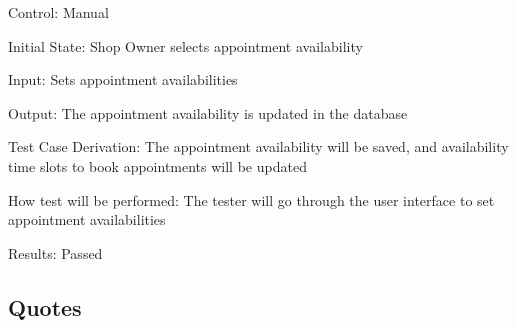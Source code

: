 \documentclass[12pt, titlepage]{article}
\begin{document}
\begin{enumerate}
	      Control: Manual

	      Initial State: Shop Owner selects appointment availability

	      Input: Sets appointment availabilities

	      Output: The appointment availability is updated in the database

	      Test Case Derivation: The appointment availability will be saved, and availability time slots to
	      book appointments will be updated

	      How test will be performed: The tester will go through the user interface to set appointment
	      availabilities

	      Results: Passed

\end{enumerate}

\subsection{Quotes}
\end{document}
